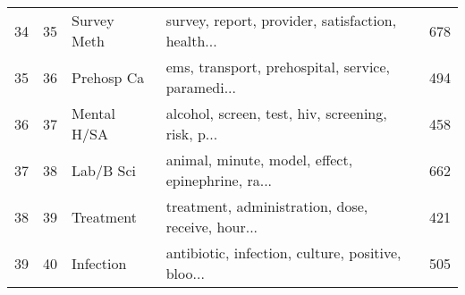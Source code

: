 \begin{tabular}{rrllr}
         34 &     35 &   Survey Meth &  survey, report, provider, satisfaction, health... &             678 \\
         35 &     36 &    Prehosp Ca &  ems, transport, prehospital, service, paramedi... &             494 \\
         36 &     37 &   Mental H/SA &  alcohol, screen, test, hiv, screening, risk, p... &             458 \\
         37 &     38 &     Lab/B Sci &  animal, minute, model, effect, epinephrine, ra... &             662 \\
         38 &     39 &     Treatment &  treatment, administration, dose, receive, hour... &             421 \\
         39 &     40 &     Infection &  antibiotic, infection, culture, positive, bloo... &             505 \\
\bottomrule
\end{tabular}
